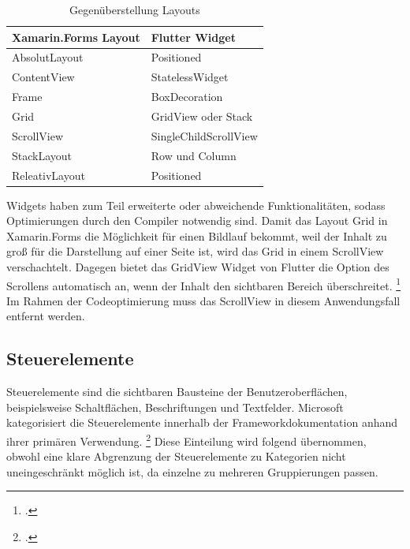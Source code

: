 \begin{table}[!ht]
\begin{tabularx}{\textwidth}{X|X}
   \textbf{Xamarin.Forms Layout} & \textbf{Flutter Widget}  \\
\hline
	AbsolutLayout       		&  Positioned	 			\\ 
	ContentView       		&  StatelessWidget	 			\\ 
	Frame       					&  BoxDecoration     	 			\\ 
	Grid            				&  GridView oder Stack		\\ 
	ScrollView            		&  SingleChildScrollView		\\ 
	StackLayout       		&  Row und Column  	 			\\ 
	ReleativLayout           &  Positioned		\\ 
\end{tabularx}
\caption{Gegenüberstellung Layouts}
 \label{tab:XamLayouts}
\end{table}

Widgets haben zum Teil erweiterte oder abweichende Funktionalitäten, sodass Optimierungen durch den Compiler notwendig sind.  Damit das Layout \glq Grid\grq{} in Xamarin.Forms die Möglichkeit für einen Bildlauf bekommt, weil der Inhalt zu groß für die Darstellung auf einer Seite ist, wird das \glq Grid\grq{} in einem \glq ScrollView\grq{} verschachtelt. Dagegen bietet das \glq GridView\grq{} Widget von Flutter die Option des Scrollens automatisch an, wenn der Inhalt den sichtbaren Bereich überschreitet. \footcite[Vgl.][Abgerufen am \today]{GoogleFlutterGridView2020} Im Rahmen der Codeoptimierung muss das \glq ScrollView\grq{} in diesem Anwendungsfall entfernt werden.

\subsection{Steuerelemente}

Steuerelemente sind die sichtbaren Bausteine der Benutzeroberflächen,  beispielsweise Schaltflächen, Beschriftungen und Textfelder.  
Microsoft kategorisiert die Steuerelemente innerhalb der Frameworkdokumentation anhand ihrer primären Verwendung. \footcite[Vgl.][Abgerufen am \today]{MicrosoftXamViews2020} Diese Einteilung wird folgend übernommen,  obwohl eine klare Abgrenzung der  Steuerelemente zu Kategorien nicht uneingeschränkt möglich ist,  da einzelne zu mehreren Gruppierungen passen.



